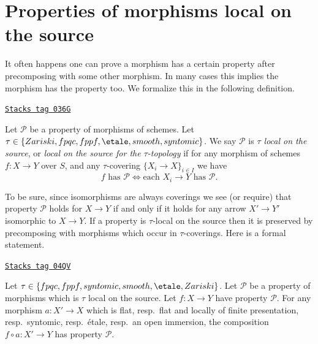 \section{Properties of morphisms local on the source}
\label{descent-section-properties-morphisms-local-source}
It often happens one can prove a morphism has a certain property
after precomposing with some other morphism. In many cases this
implies the morphism has the property too. We formalize
this in the following definition.

\begin{definition}
\label{descent-definition-property-morphisms-local-source}
\href{https://stacks.math.columbia.edu/tag/036G}{\texttt{Stacks tag 036G}}

Let $\mathcal{P}$ be a property of morphisms of schemes.
Let $\tau \in \{Zariski, \linebreak[0] fpqc, \linebreak[0] fppf, \linebreak[0]
\etale, \linebreak[0] smooth, \linebreak[0] syntomic\}$.
We say $\mathcal{P}$ is
{\it $\tau$ local on the source}, or
{\it local on the source for the $\tau$-topology} if for
any morphism of schemes $f : X \to Y$ over $S$, and any
$\tau$-covering $\{X_i \to X\}_{i \in I}$ we
have
$$
f \text{ has }\mathcal{P}
\Leftrightarrow
\text{each }X_i \to Y\text{ has }\mathcal{P}.
$$
\end{definition}

To be sure, since isomorphisms are always coverings
we see (or require) that property $\mathcal{P}$ holds for $X \to Y$
if and only if it holds for any arrow $X' \to Y'$ isomorphic to $X \to Y$.
If a property is $\tau$-local on the source then it is preserved by
precomposing with morphisms which occur in $\tau$-coverings. Here
is a formal statement.

\begin{lemma}
\label{descent-lemma-precompose-property-local-source}
\href{https://stacks.math.columbia.edu/tag/04QV}{\texttt{Stacks tag 04QV}}

Let $\tau \in \{fpqc, fppf, syntomic, smooth, \etale, Zariski\}$.
Let $\mathcal{P}$ be a property of morphisms which is $\tau$ local
on the source. Let $f : X \to Y$ have property $\mathcal{P}$.
For any morphism $a : X' \to X$ which is
flat, resp.\ flat and locally of finite presentation, resp.\ syntomic,
resp.\ \'etale, resp.\ an open immersion, the composition
$f \circ a : X' \to Y$ has property $\mathcal{P}$.
\end{lemma}

